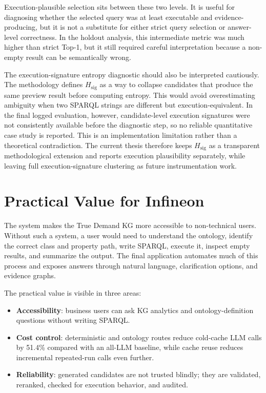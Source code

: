 \documentclass[
  12pt,
  english,
  oneside]{report}
\begin{document}
Execution-plausible selection sits between these two levels. It is useful for diagnosing whether the selected query was at least executable and evidence-producing, but it is not a substitute for either strict query selection or answer-level correctness. In the holdout analysis, this intermediate metric was much higher than strict Top-1, but it still required careful interpretation because a non-empty result can be semantically wrong.

The execution-signature entropy diagnostic should also be interpreted cautiously. The methodology defines \(H_{\mathrm{sig}}\) as a way to collapse candidates that produce the same preview result before computing entropy. This would avoid overestimating ambiguity when two SPARQL strings are different but execution-equivalent. In the final logged evaluation, however, candidate-level execution signatures were not consistently available before the diagnostic step, so no reliable quantitative case study is reported. This is an implementation limitation rather than a theoretical contradiction. The current thesis therefore keeps \(H_{\mathrm{sig}}\) as a transparent methodological extension and reports execution plausibility separately, while leaving full execution-signature clustering as future instrumentation work.

\section{Practical Value for Infineon}
\label{sec:practical-value-infineon}

The system makes the True Demand KG more accessible to non-technical users. Without such a system, a user would need to understand the ontology, identify the correct class and property path, write SPARQL, execute it, inspect empty results, and summarize the output. The final application automates much of this process and exposes answers through natural language, clarification options, and evidence graphs.

The practical value is visible in three areas:

\begin{itemize}
    \item \textbf{Accessibility}: business users can ask KG analytics and ontology-definition questions without writing SPARQL.
    \item \textbf{Cost control}: deterministic and ontology routes reduce cold-cache LLM calls by 51.4\% compared with an all-LLM baseline, while cache reuse reduces incremental repeated-run calls even further.
    \item \textbf{Reliability}: generated candidates are not trusted blindly; they are validated, reranked, checked for execution behavior, and audited.
\end{itemize}
\end{document}
